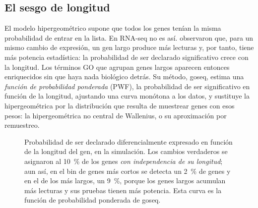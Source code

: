 \subsection{El sesgo de longitud}

El modelo hipergeométrico supone que todos los genes tenían la misma probabilidad de entrar en la lista. En RNA-seq no es así. \textcite{c11-young2010} observaron que, para un mismo cambio de expresión, un gen largo produce más lecturas y, por tanto, tiene más potencia estadística: la probabilidad de ser declarado significativo crece con la longitud. Los términos GO que agrupan genes largos aparecen entonces enriquecidos sin que haya nada biológico detrás. Su método, goseq, estima una \emph{función de probabilidad ponderada} (PWF), la probabilidad de ser significativo en función de la longitud, ajustando una curva monótona a los datos, y sustituye la hipergeométrica por la distribución que resulta de muestrear genes con esos pesos: la hipergeométrica no central de Wallenius, o su aproximación por remuestreo.

\begin{figure}[!htb]
\centering
{}
\caption[Sesgo de longitud en la detección]{Probabilidad de ser declarado diferencialmente expresado en función de la longitud del gen, en la simulación. Los cambios verdaderos se asignaron al \SI{10}{\percent} de los genes \emph{con independencia de su longitud}; aun así, en el bin de genes más cortos se detecta un \SI{2}{\percent} de genes y en el de los más largos, un \SI{9}{\percent}, porque los genes largos acumulan más lecturas y sus pruebas tienen más potencia. Esta curva es la función de probabilidad ponderada de goseq.}
\label{fig:11-pwf}
\end{figure}

